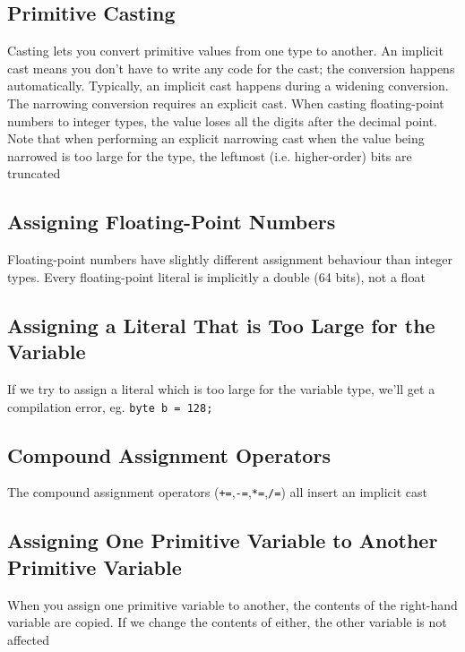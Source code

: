 \subsection{Primitive Casting}
Casting lets you convert primitive values from one type to another. An implicit 
cast means you don't have to write any code for the cast; the conversion 
happens automatically. Typically, an implicit cast happens during a widening 
conversion. The narrowing conversion requires an explicit cast. When casting 
floating-point numbers to integer types, the value loses all the digits after 
the decimal point. Note that when performing an explicit narrowing cast when 
the value being narrowed is too large for the type, the leftmost (i.e.  
higher-order) bits are truncated

\subsection{Assigning Floating-Point Numbers}
Floating-point numbers have slightly different assignment behaviour than 
integer types. Every floating-point literal is implicitly a double (64 bits), 
not a float

\subsection{Assigning a Literal That is Too Large for the Variable}
If we try to assign a literal which is too large for the variable type, we'll 
get a compilation error, eg. \verb#byte b = 128;#

\subsection{Compound Assignment Operators}
The compound assignment operators (\verb#+=#,\verb#-=#,\verb#*=#,\verb#/=#) all 
insert an implicit cast

\subsection{Assigning One Primitive Variable to Another Primitive Variable}
When you assign one primitive variable to another, the contents of the 
right-hand variable are copied. If we change the contents of either, the other 
variable is not affected

